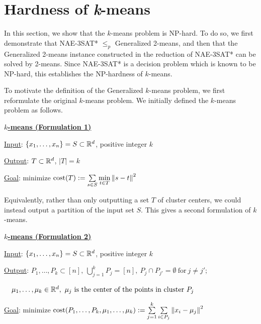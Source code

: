 \section{Hardness of \emph{k}-means}

In this section, we show that the $k$-means problem is NP-hard. To do
so, we first demonstrate that NAE-3SAT* $\le_p$ Generalized 2-means, and
then that the Generalized 2-means instance constructed in the reduction
of NAE-3SAT* can be solved by 2-means. Since NAE-3SAT* is a decision
problem which is known to be NP-hard, this establishes the NP-hardness
of $k$-means.

To motivate the definition of the Generalized $k$-means problem, we
first reformulate the original $k$-means problem. We initially defined
the $k$-means problem as follows.

\begin{mdframed}
    \underline{\textbf{$k$-means (Formulation 1)}}
    
    \vspace{0.5em} \underline{Input}:
    $\{x_1, \ldots, x_n\} = S \subset \mathbb{R}^d$, positive integer $k$
    
    \vspace{0.5em} \underline{Output}: $T \subset \mathbb{R}^d$, $|T| = k$
    
    \vspace{0.5em} \underline{Goal}: minimize $\text{cost}(T) :=
    \sum\limits_{s \in S} \min\limits_{t \in T} \left\lVert s - t\right\rVert^2$
\end{mdframed}

Equivalently, rather than only outputting a set $T$ of cluster centers,
we could instead output a partition of the input set $S$. This gives a
second formulation of $k$-means.

\begin{mdframed}
    \underline{\textbf{$k$-means (Formulation 2)}}
    
    \vspace{0.5em} \underline{Input}:
    $\{x_1,\ldots,x_n\} = S \subset \mathbb{R}^d$, positive integer $k$
    
    \vspace{0.5em} \underline{Output}: $P_1, \ldots, P_k \subset [n],
    ~\bigcup_{j=1}^k P_j = [n],
    ~P_j \cap P_{j'} = \emptyset ~\text{for}~ j \ne j';$

    $\quad \mu_1, \ldots, \mu_k \in \mathbb{R}^d,
    ~\mu_j ~\text{is the center of the points in cluster}~ P_j$
    
    \vspace{0.5em} \underline{Goal}: minimize
    $\text{cost}(P_1, \ldots, P_k, \mu_1, \ldots, \mu_k) :=
    \sum\limits_{j=1}^k \sum\limits_{i \in P_j} \left\lVert x_i - \mu_j\right\rVert^2$
\end{mdframed}

